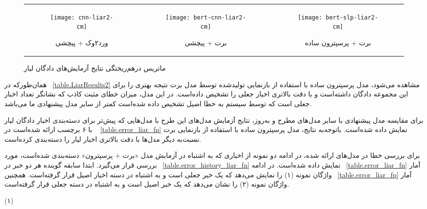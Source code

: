 \begin{figure}[!h]
	\centering
	\begin{tabular}{ccc}
		\begin{subfigure}{0.33\textwidth}
			\centering
			\caption{ورد۲وک + پیچشی}
			\texttt{[image: cnn-liar2-cm]}
		\end{subfigure}
		& 
		\begin{subfigure}{0.33\textwidth}
			\centering
			\caption{برت + پیچشی}
			\texttt{[image: bert-cnn-liar2-cm]}
		\end{subfigure}
		&
		\begin{subfigure}{0.33\textwidth}
			\centering
			\caption{برت + پرسپترون ساده}
			\texttt{[image: bert-slp-liar2-cm]}
		\end{subfigure}
	\end{tabular}
	\caption{ ماتریس درهم‌ریختگی نتایج آزمایش‌های دادگان لیار}
	\label{LIAR-CM}
\end{figure}

همان‌طورکه در \tablename~\ref{table.LiarResults2}  مشاهده می‌شود، مدل پرسپترون ساده با استفاده از بازنمایی تولیدشده توسط مدل برت نتیجه بهتری را برای این مجموعه دادگان داشته‌است و با دقت بالاتری اخبار جعلی را تشخیص داده‌است.  در این مدل، میزان خطای مثبت کاذب که نشانگر تعداد اخبار جعلی است که توسط سیستم به خطا اصیل تشخیص داده شده‌است کمتر از سایر مدل پیشنهادی ما می‌باشد.

برای مقایسه مدل پیشنهادی با سایر مدل‌های مطرح و به‌روز، نتایج آزمایش مدل‌های این طرح با مدل‌هایی که پیش‌تر برای دسته‌بندی اخبار دادگان لیار با ۶ برچسب ارائه شده‌است در  \tablename~ \ref{table.error_liar_fn} نمایش داده شده‌است.  باتوجه‌به نتایج، مدل پرسپترون ساده با استفاده از بازنمایی برت نسبت‌به دیگر مدل‌ها با دقت بالاتری اخبار لیار را دسته‌بندی کرده‌است.

برای بررسی خطا در مدل‌های ارائه شده، در ادامه دو نمونه از اخباری که به اشتباه در آزمایش مدل «برت + پرسپترون» دسته‌بندی شده‌است، مورد بررسی قرار می‌گیرد. ابتدا سابقه گوینده هر دو خبر در  \tablename~\ref{table.error_history_liar_fn}  نمایش داده شده‌است.  در ادامه  \tablename~\ref{table.error_liar_fn}   آمار واژگان نمونه  (۱)   را نمایش می‌دهد که یک خبر جعلی است و به اشتباه در دسته اخبار اصیل قرار گرفته‌است. همچنین  \tablename~\ref{table.error_liar_fp}   آمار واژگان نمونه  (۲)   را نشان می‌دهد که یک خبر اصیل است و به اشتباه در دسته جعلی قرار گرفته‌است. 



(۱)\\
\begin{flushleft}\end{flushleft}

